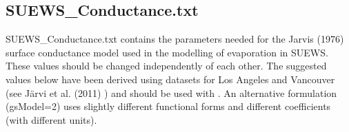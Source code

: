\documentclass[letterpaper,10pt,english]{sphinxmanual}
\begin{document}
\subsection{SUEWS\_Conductance.txt}
\label{\detokenize{input_files/SUEWS_SiteInfo/SUEWS_Conductance::doc}}\label{\detokenize{input_files/SUEWS_SiteInfo/SUEWS_Conductance:suews-conductance-txt}}
SUEWS\_Conductance.txt contains the parameters needed for the Jarvis
(1976) surface conductance model used in the modelling of evaporation in
SUEWS. These values should  be changed independently of each
other. The suggested values below have been derived using datasets for
Los Angeles and Vancouver (see Järvi et al. (2011) \label{\detokenize{input_files/SUEWS_SiteInfo/SUEWS_Conductance:id1}}{\hyperref[\detokenize{references:j11}]{\sphinxcrossref{{[}J11{]}}}}) and should be
used with . An alternative formulation (gsModel=2) uses
slightly different functional forms and different coefficients (with
different units).
\end{document}
